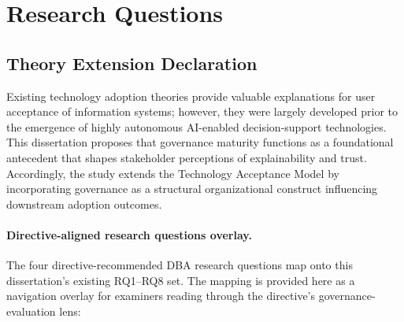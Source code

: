 \section{Research Questions}

\subsection{Theory Extension Declaration}
\label{sec:theory_extension_declaration}

\noindent Existing technology adoption theories provide valuable explanations for user acceptance of information systems; however, they were largely developed prior to the emergence of highly autonomous AI-enabled decision-support technologies. This dissertation proposes that governance maturity functions as a foundational antecedent that shapes stakeholder perceptions of explainability and trust. Accordingly, the study extends the Technology Acceptance Model by incorporating governance as a structural organizational construct influencing downstream adoption outcomes.

\label{sec:hypotheses}

\paragraph{Directive-aligned research questions overlay.}
\label{para:rqs_lens}
The four directive-recommended DBA research questions map onto this dissertation's existing RQ1--RQ8 set. The mapping is provided here as a navigation overlay for examiners reading through the directive's governance-evaluation lens:

